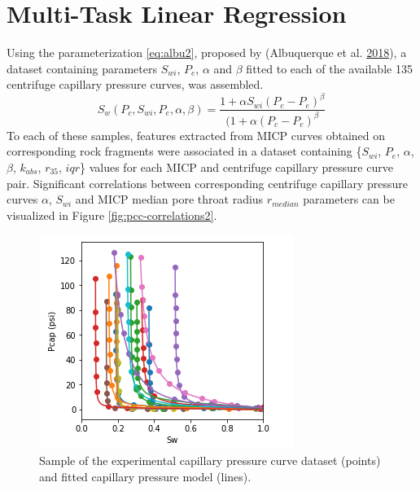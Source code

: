 \documentclass[english,msc,numbers]{coppe}
\begin{document}
  \hypertarget{multi-task-linear-regression}{%
  \section{Multi-Task Linear Regression}\label{multi-task-linear-regression}}
  
  Using the parameterization \eqref{eq:albu2}, proposed by (Albuquerque et al. \protect\hyperlink{ref-Albuquerque2018}{2018}), a dataset containing parameters \(S_{wi}\), \(P_e\), \(\alpha\) and \(\beta\) fitted to each of the available 135 centrifuge capillary pressure curves, was assembled.
  \begin{equation} 
    S_w(P_c, S_{wi}, P_e, \alpha, \beta) = \frac{1+\alpha S_{wi}(P_c - P_e)^\beta}{(1+\alpha (P_c - P_e)^\beta}
    \label{eq:albu2}
  \end{equation}
  To each of these samples, features extracted from MICP curves obtained on corresponding rock fragments were associated in a dataset containing \{\(S_{wi}\), \(P_e\), \(\alpha\), \(\beta\), \(k_{abs}\), \(r_{35}\), \(iqr\)\} values for each MICP and centrifuge capillary pressure curve pair. Significant correlations between corresponding centrifuge capillary pressure curves \(\alpha\), \(S_{wi}\) and MICP median pore throat radius \(r_{median}\) parameters can be visualized in Figure \ref{fig:pcc-correlations2}.
  \begin{figure}
  
  {\centering \includegraphics[width=0.7\linewidth]{figure/2-9-pcc-dataset} 
  
  }
  
  \caption{Sample of the experimental capillary pressure curve dataset (points) and fitted capillary pressure model (lines).}\label{fig:pcc-dataset2}
  \end{figure}
\end{document}
